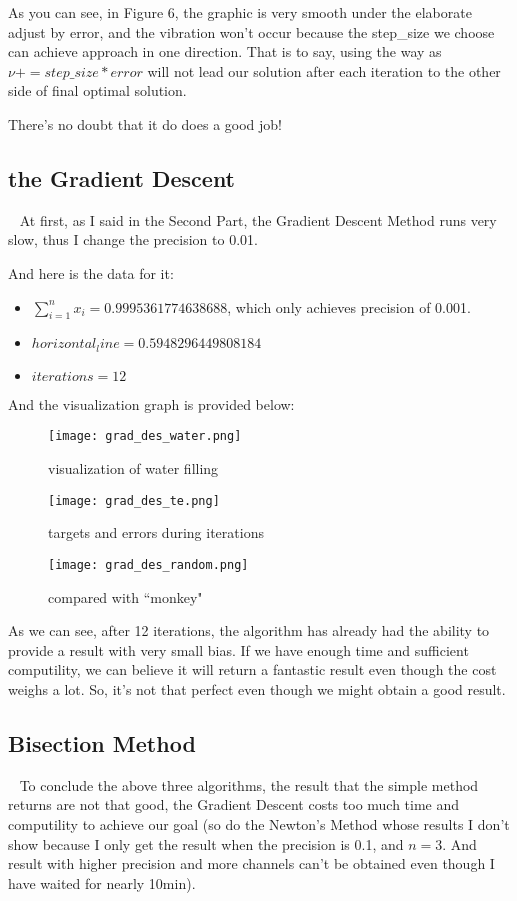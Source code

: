 \documentclass[a4paper,12pt]{article}
\begin{document}
    As you can see, in Figure 6, the graphic is very smooth under the elaborate adjust by error, and the vibration won't occur because the step\_size we choose can achieve approach in one direction.
    That is to say, using the way as $\nu += step\_size * error$ will not lead our solution after each iteration to the other side of final optimal solution.

    There's no doubt that it do does a good job!
    \subsection{the Gradient Descent}
    \
    \newline
    \indent At first, as I said in the Second Part, the Gradient Descent Method runs very slow, thus I change the precision to 0.01.

    And here is the data for it:
    \begin{itemize}
        \item $\sum_{i=1}^{n} x_i = 0.9995361774638688$, which only achieves precision of 0.001.
        \item $horizontal_line = 0.5948296449808184$
        \item $iterations = 12$
    \end{itemize}

    And the visualization graph is provided below:
    \begin{figure}[H]
        \centering
        \texttt{[image: grad\_des\_water.png]}
        \caption{visualization of water filling}
    \end{figure}
    \begin{figure}[H]
        \centering
        \texttt{[image: grad\_des\_te.png]}
        \caption{targets and errors during iterations}
    \end{figure}
    \begin{figure}[H]
        \centering
        \texttt{[image: grad\_des\_random.png]}
        \caption{compared with ``monkey"}
    \end{figure}

    As we can see, after 12 iterations, the algorithm has already had the ability to provide a result with very small bias. If we have enough time and sufficient computility, we can believe it will return a fantastic result even though the cost weighs a lot. So, it's not that perfect even though we might obtain a good result.
    \subsection{Bisection Method}
    \
    \newline
    \indent To conclude the above three algorithms, the result that the simple method returns are not that good, the Gradient Descent costs too much time and computility to achieve our goal (so do the Newton's Method whose results I don't show because I only get the result when the precision is 0.1, and $n=3$. And result with higher precision and more channels can't be obtained even though I have waited for nearly 10min).
\end{document}
